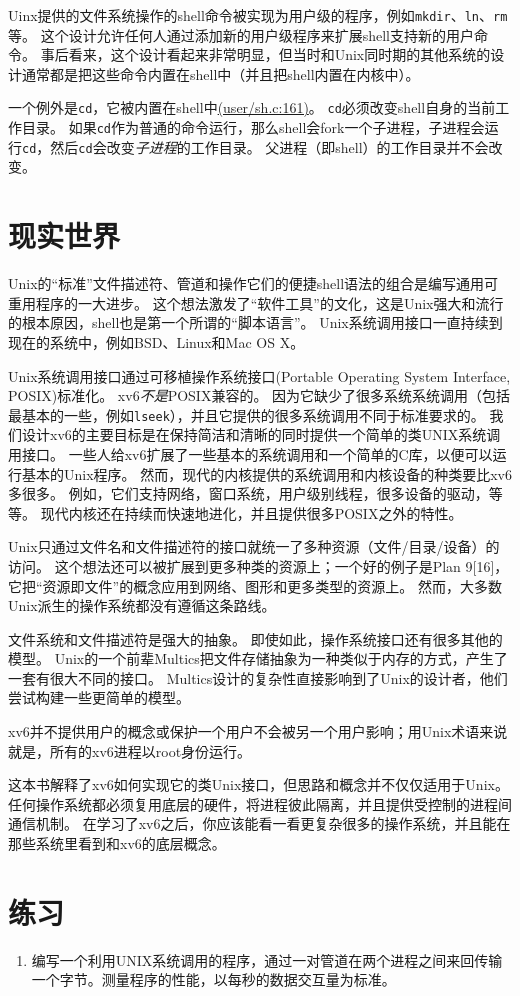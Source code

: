 Uinx提供的文件系统操作的shell命令被实现为用户级的程序，例如\texttt{mkdir}、\texttt{ln}、\texttt{rm}等。
这个设计允许任何人通过添加新的用户级程序来扩展shell支持新的用户命令。
事后看来，这个设计看起来非常明显，但当时和Unix同时期的其他系统的设计通常都是把这些命令内置在shell中（并且把shell内置在内核中）。

一个例外是\texttt{cd}，它被内置在shell中\href{https://github.com/mit-pdos/xv6-riscv/blob/risc/user/sh.c#L161}{(user/sh.c:161)}。
\texttt{cd}必须改变shell自身的当前工作目录。
如果\texttt{cd}作为普通的命令运行，那么shell会fork一个子进程，子进程会运行\texttt{cd}，然后\texttt{cd}会改变\emph{子进程}的工作目录。
父进程（即shell）的工作目录并不会改变。

\section{现实世界}
Unix的“标准”文件描述符、管道和操作它们的便捷shell语法的组合是编写通用可重用程序的一大进步。
这个想法激发了“软件工具”的文化，这是Unix强大和流行的根本原因，shell也是第一个所谓的“脚本语言”。
Unix系统调用接口一直持续到现在的系统中，例如BSD、Linux和Mac OS X。

Unix系统调用接口通过可移植操作系统接口(Portable Operating System Interface, POSIX)标准化。
xv6\emph{不是}POSIX兼容的。
因为它缺少了很多系统系统调用（包括最基本的一些，例如\texttt{lseek}），并且它提供的很多系统调用不同于标准要求的。
我们设计xv6的主要目标是在保持简洁和清晰的同时提供一个简单的类UNIX系统调用接口。
一些人给xv6扩展了一些基本的系统调用和一个简单的C库，以便可以运行基本的Unix程序。
然而，现代的内核提供的系统调用和内核设备的种类要比xv6多很多。
例如，它们支持网络，窗口系统，用户级别线程，很多设备的驱动，等等。
现代内核还在持续而快速地进化，并且提供很多POSIX之外的特性。

Unix只通过文件名和文件描述符的接口就统一了多种资源（文件/目录/设备）的访问。
这个想法还可以被扩展到更多种类的资源上；一个好的例子是Plan 9[16]，它把“资源即文件”的概念应用到网络、图形和更多类型的资源上。
然而，大多数Unix派生的操作系统都没有遵循这条路线。

文件系统和文件描述符是强大的抽象。
即使如此，操作系统接口还有很多其他的模型。
Unix的一个前辈Multics把文件存储抽象为一种类似于内存的方式，产生了一套有很大不同的接口。
Multics设计的复杂性直接影响到了Unix的设计者，他们尝试构建一些更简单的模型。

xv6并不提供用户的概念或保护一个用户不会被另一个用户影响；用Unix术语来说就是，所有的xv6进程以root身份运行。

这本书解释了xv6如何实现它的类Unix接口，但思路和概念并不仅仅适用于Unix。
任何操作系统都必须复用底层的硬件，将进程彼此隔离，并且提供受控制的进程间通信机制。
在学习了xv6之后，你应该能看一看更复杂很多的操作系统，并且能在那些系统里看到和xv6的底层概念。

\section{练习}

\begin{enumerate}
    \item 编写一个利用UNIX系统调用的程序，通过一对管道在两个进程之间来回传输一个字节。测量程序的性能，以每秒的数据交互量为标准。
\end{enumerate}
